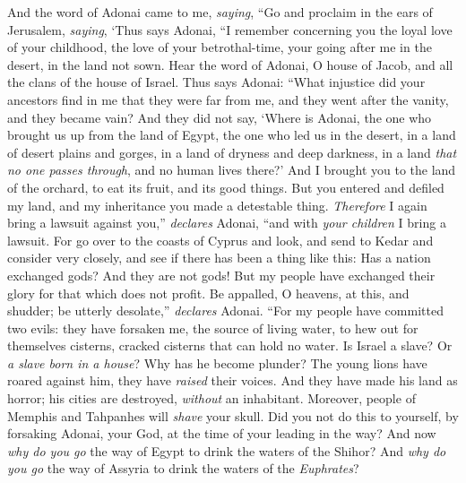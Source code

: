 \begin{biblechapter} %
 And the word of Adonai came to me, \textit{saying},
\verse “Go and proclaim in the ears of Jerusalem, \textit{saying}, ‘Thus says Adonai,
\verse “I remember concerning you the loyal love of your childhood, 
the love of your betrothal-time, 
your going after me in the desert, 
in the land not sown.
 Hear the word of Adonai, O house of Jacob, and all the clans of the house of Israel.
\verse Thus says Adonai:
\verse “What injustice did your ancestors find in me 
that they were far from me, 
and they went after the vanity, 
and they became vain?
\verse And they did not say, 
‘Where is Adonai, 
the one who brought us up from the land of Egypt, 
the one who led us in the desert, 
in a land of desert plains and gorges, 
in a land of dryness and deep darkness, 
in a land \textit{that no one passes through}, 
and no human lives there?’
\verse And I brought you to the land of the orchard, 
to eat its fruit, and its good things. 
But you entered and defiled my land, 
and my inheritance you made a detestable thing.
 \textit{Therefore} I again bring a lawsuit against you,” \textit{declares} Adonai, 
“and with \textit{your children} I bring a lawsuit.
\verse For go over to the coasts of Cyprus and look, 
and send to Kedar and consider very closely, 
and see if there has been a thing like this:
\verse Has a nation exchanged gods? And they are not gods! 
But my people have exchanged their glory for that which does not profit.
\verse Be appalled, O heavens, at this, and shudder; 
be utterly desolate,” \textit{declares} Adonai.
\verse “For my people have committed two evils: 
they have forsaken me, the source of living water, 
to hew out for themselves cisterns, cracked cisterns that can hold no water.
\verse Is Israel a slave? Or \textit{a slave born in a house}? 
Why has he become plunder?
\verse The young lions have roared against him, 
they have \textit{raised} their voices. 
And they have made his land as horror; 
his cities are destroyed, \textit{without} an inhabitant.
\verse Moreover, people of Memphis and Tahpanhes 
will \textit{shave} your skull.
\verse Did you not do this to yourself, 
by forsaking Adonai, your God, 
at the time of your leading in the way?
\verse And now \textit{why do you go} the way of Egypt 
to drink the waters of the Shihor? 
And \textit{why do you go} the way of Assyria 
to drink the waters of the \textit{Euphrates}?

\end{biblechapter}
